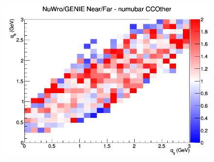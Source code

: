 \documentclass[12pt]{article}
\begin{document}
\begin{figure}[h]
\endminipage
{}
\includegraphics[width=\linewidth]{eff_q0_q3/GAr/ratios/CCOther_NuWro_GENIE_numubar_NF_q3_q0.png}
\endminipage
\newline
\end{figure}
\clearpage
\end{document}
